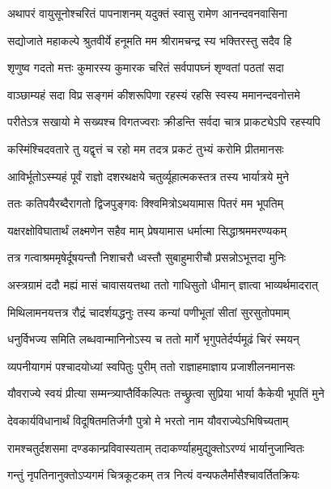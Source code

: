 

\twolineshloka
{अथापरं वायुसूनोश्चरितं पापनाशनम्}
{यदुक्तं स्वासु रामेण आनन्दवनवासिना}%

\twolineshloka
{सद्योजाते महाकल्पे श्रुतवीर्ये हनूमति}
{मम श्रीरामचन्द्र स्य भक्तिरस्तु सदैव हि}%

\twolineshloka
{शृणुष्व गदतो मत्तः कुमारस्य कुमारक}
{चरितं सर्वपापघ्नं शृण्वतां पठतां सदा}%

\twolineshloka
{वाञ्छाम्यहं सदा विप्र सङ्गमं कीशरूपिणा}
{रहस्यं रहसि स्वस्य ममानन्दवनोत्तमे}%

\twolineshloka
{परीतेऽत्र सखायो मे सख्यश्च विगतज्वराः}
{क्रीडन्ति सर्वदा चात्र प्राकट्येऽपि रहस्यपि}%

\twolineshloka
{कस्मिंश्चिदवतारे तु यद्वृत्तं च रहो मम}
{तदत्र प्रकटं तुभ्यं करोमि प्रीतमानसः}%

\twolineshloka
{आविर्भूतोऽस्म्यहं पूर्वं राज्ञो दशरथक्षये}
{चतुर्व्यूहात्मकस्तत्र तस्य भार्यात्रये मुने}%

\twolineshloka
{ततः कतिपयैरब्दैरागतो द्विजपुङ्गवः}
{क्श्विमित्रोऽथयामास पितरं मम भूपतिम्}%

\twolineshloka
{यक्षरक्षोविघातार्थं लक्ष्मणेन सहैव माम्}
{प्रेषयामास धर्मात्मा सिद्धाश्रममरण्यकम्}%

\twolineshloka
{तत्र गत्वाश्रममृषेर्दूषयन्तौ निशाचरौ}
{ध्वस्तौ सुबाहुमारीचौ प्रसन्नोऽभूत्तदा मुनिः}%

\twolineshloka
{अस्त्रग्रामं ददौ मह्यं मासं चावासयत्तथा}
{ततो गाधिसुतो धीमान् ज्ञात्वा भाव्यर्थमादरात्}%

\twolineshloka
{मिथिलामनयत्तत्र रौद्रं चादर्शयद्धनुः}
{तस्य कन्यां पणीभूतां सीतां सुरसुतोपमाम्}%

\twolineshloka
{धनुर्विभज्य समिति लब्धवान्मानिनोऽस्य च}
{ततो मार्गे भृगुपतेर्दर्प्पमूढं चिरं स्मयन्}%

\twolineshloka
{व्यपनीयागमं पश्चादयोध्यां स्वपितुः पुरीम्}
{ततो राज्ञाहमाज्ञाय प्रजाशीलनमानसः}%

\twolineshloka
{यौवराज्ये स्वयं प्रीत्या सम्मन्त्र्याप्तैर्विकल्पितः}
{तच्छ्रुत्वा सुप्रिया भार्या कैकेयी भूपतिं मुने}%

\twolineshloka
{देवकार्यविधानार्थं विदूषितमतिर्जगौ}
{पुत्रो मे भरतो नाम यौवराज्येऽभिषिच्यताम्}%

\twolineshloka
{रामश्चतुर्दशसमा दण्डकान्प्रविवास्यताम्}
{तदाकर्ण्याहमुद्युक्तोऽरण्यं भार्यानुजान्वितः}%

\twolineshloka
{गन्तुं नृपतिनानुक्तोऽप्यगमं चित्रकूटकम्}
{तत्र नित्यं वन्यफलैर्मांसैश्चावर्तितक्रियः}%

